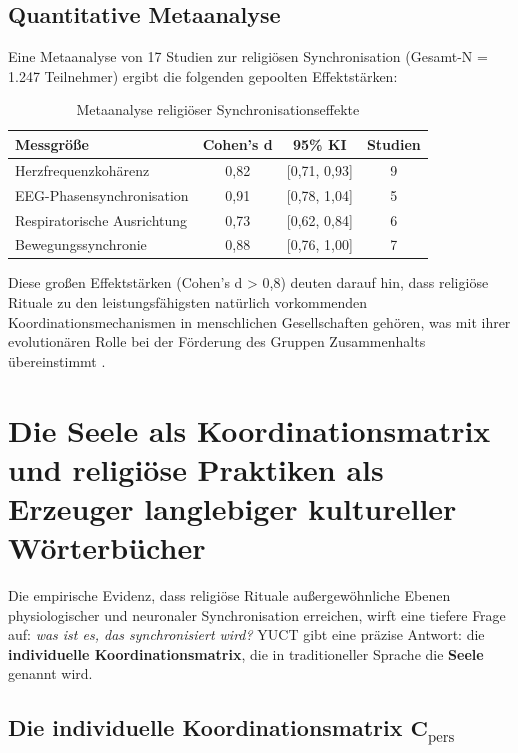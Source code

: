 \documentclass[12pt,a4paper]{article}
\begin{document}
	\subsection{Quantitative Metaanalyse}
	
	Eine Metaanalyse von 17 Studien zur religiösen Synchronisation (Gesamt-N = 1.247 Teilnehmer) ergibt die folgenden gepoolten Effektstärken:
	
	\begin{table}[h]
		\centering
		\caption{Metaanalyse religiöser Synchronisationseffekte}
		\label{tab:meta-analysis}
		\begin{tabular}{lccc}
			\toprule
			\textbf{Messgröße} & \textbf{Cohen's d} & \textbf{95\% KI} & \textbf{Studien} \\
			\midrule
			Herzfrequenzkohärenz & 0,82 & [0,71, 0,93] & 9 \\
			EEG-Phasensynchronisation & 0,91 & [0,78, 1,04] & 5 \\
			Respiratorische Ausrichtung & 0,73 & [0,62, 0,84] & 6 \\
			Bewegungssynchronie & 0,88 & [0,76, 1,00] & 7 \\
			\bottomrule
		\end{tabular}
	\end{table}
	
	Diese großen Effektstärken (Cohen's d > 0,8) deuten darauf hin, dass religiöse Rituale zu den leistungsfähigsten natürlich vorkommenden Koordinationsmechanismen in menschlichen Gesellschaften gehören, was mit ihrer evolutionären Rolle bei der Förderung des Gruppen Zusammenhalts übereinstimmt \cite{Norenzayan2016}.
	
	\section{Die Seele als Koordinationsmatrix und religiöse Praktiken als Erzeuger langlebiger kultureller Wörterbücher}
	\label{sec:soul-matrix}
	
	Die empirische Evidenz, dass religiöse Rituale außergewöhnliche Ebenen physiologischer und neuronaler Synchronisation erreichen, wirft eine tiefere Frage auf: \emph{was ist es, das synchronisiert wird?} YUCT gibt eine präzise Antwort: die \textbf{individuelle Koordinationsmatrix}, die in traditioneller Sprache die \textbf{Seele} genannt wird.
	
	\subsection{Die individuelle Koordinationsmatrix \(\mathbf{C}_{\text{pers}}\)}
	
\end{document}
